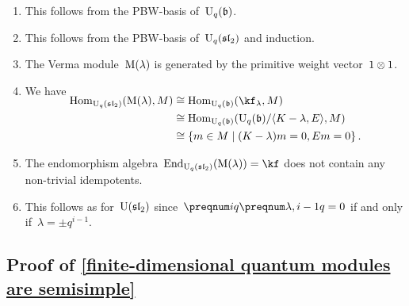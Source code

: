\documentclass[a4paper, 11pt, oneside]{scrartcl}
\begin{document}
\begin{enumerate}
  \item
    This follows from the PBW-basis of~$\operatorname{U}_q(\mathfrak{b})$.
  \item
    This follows from the PBW-basis of~$\operatorname{U}_q(\mathfrak{sl}_2)$ and induction.
  \item
    The Verma module~$\operatorname{M}(\lambda)$ is generated by the primitive weight vector~$1 \otimes 1$.
  \item
    We have
    \begin{align*}
      \SwapAboveDisplaySkip
      \Hom_{\Univ_q(\sllie_2)}( \verma(\lambda), M )
      &\cong
      \Hom_{\Univ_q(\blie)}( \kf_\lambda, M )
      \\
      &\cong
      \Hom_{\Univ_q(\blie)}( \Univ_q(\blie) / \gen{K - \lambda, E}, M)
      \\
      &\cong
      \{
        m \in M
      \suchthat
        (K - \lambda) m = 0,
        E m = 0
      \} \,.
    \end{align*}
  \item
    The endomorphism algebra~$\End_{\Univ_q(\sllie_2)}( \verma(\lambda) ) = \kf$ does not contain any non-trivial idempotents.
  \item
    This follows as for~$\operatorname{U}(\mathfrak{sl}_2)$ since~$\qnum{i} \qnum{\lambda, i-1} = 0$ if and only if~$\lambda = \pm q^{i-1}$.
\end{enumerate}


\subsection{Proof of \cref{finite-dimensional quantum modules are semisimple}}
\label{proof of finite-dimensional quantum modules are semisimple}
\end{document}
